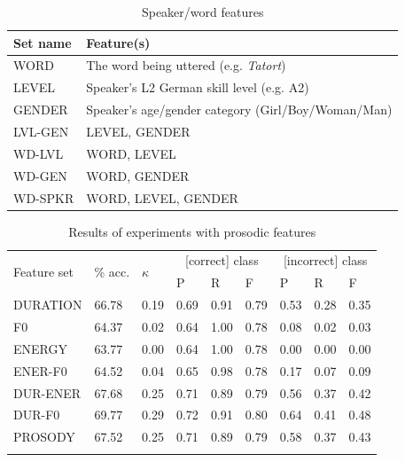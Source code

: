 \begin{table}
			\begin{subtable}[h]{\textwidth}
				\centering
				\caption{Speaker/word features}
				\begin{tabular}{ll}
				\toprule
				Set name & Feature(s) \\
				\midrule
				WORD & The word being uttered (e.g. \textit{Tatort}) \\
				LEVEL & Speaker's L2 German skill level (e.g. A2)\\
				GENDER & Speaker's age/gender category (Girl/Boy/Woman/Man)\\
				LVL-GEN & LEVEL, GENDER \\
				WD-LVL & WORD, LEVEL \\
				WD-GEN & WORD, GENDER \\
				WD-SPKR & WORD, LEVEL, GENDER \\
				\bottomrule
				\end{tabular}		
			\end{subtable}
				
			\label{tab:features:sets}
		\end{table}
		
		
		\begin{table}
			\centering
			\caption{Results of experiments with prosodic features  }
			\begin{tabularx}{\textwidth}{lXXXXXXXX}			
			\toprule
			\multirow{2}{*}{Feature set} & 
			\multirow{2}{*}{\% acc.} & \multirow{2}{*}{$\kappa$} & \multicolumn{3}{c}{[correct] class} & \multicolumn{3}{c}{[incorrect] class} \\
			 \cmidrule(lr){4-6} \cmidrule(lr){7-9}
			 & & & P & R & F & P & R & F \\
			\midrule
DURATION	&	66.78	&	0.19	&	0.69	&	0.91	&	0.79	&	0.53	&	0.28	&	0.35	\\
F0	&	64.37	&	0.02	&	0.64	&	1.00	&	0.78	&	0.08	&	0.02	&	0.03	\\
ENERGY	&	63.77	&	0.00	&	0.64	&	1.00	&	0.78	&	0.00	&	0.00	&	0.00	\\
			\addlinespace
ENER-F0	&	64.52	&	0.04	&	0.65	&	0.98	&	0.78	&	0.17	&	0.07	&	0.09	\\
DUR-ENER	&	67.68	&	0.25	&	0.71	&	0.89	&	0.79	&	0.56	&	0.37	&	0.42	\\
DUR-F0	&	69.77	&	0.29	&	0.72	&	0.91	&	0.80	&	0.64	&	0.41	&	0.48	\\
			\addlinespace
PROSODY 	&	67.52	&	0.25	&	0.71	&	0.89	&	0.79	&	0.58	&	0.37	&	0.43	\\
			\bottomrule
			\label{tab:results:prosody}
			\end{tabularx}
		\end{table}
		
